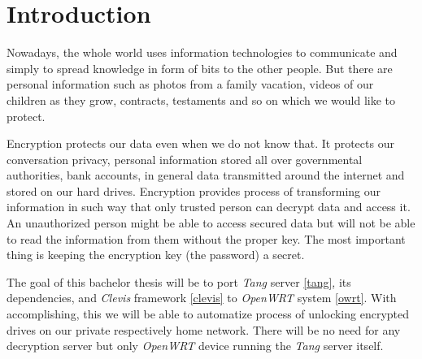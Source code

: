 \documentclass[../xdudla00-porting-Tang-to-Open-WRT.tex]{subfiles}
\begin{document}

\chapter{Introduction}\label{introduction}

Nowadays, the whole world uses information technologies to communicate and simply to spread knowledge in form of bits to the other people.  But there are personal information such as photos from a family vacation, videos of our children as they grow, contracts, testaments and so on which we would like to protect.

Encryption protects our data even when we do not know that. It protects our conversation privacy, personal information stored all over governmental authorities, bank accounts, in general data transmitted around the internet and stored on our hard drives. Encryption provides process of transforming our information in such way that only trusted person can decrypt data and access it. An unauthorized person might be able to access secured data but will not be able to read the information from them without the proper key. The most important thing is keeping the encryption key (the password) a secret.

The goal of this bachelor thesis will be to port %
{\it Tang} server \ref{tang}, its dependencies, and {\it Clevis} framework \ref{clevis} to {\it OpenWRT} system \ref{owrt}. With accomplishing, this we will be able to automatize process of unlocking encrypted drives on our private respectively home network. There will be no need for any decryption server but only {\it OpenWRT} device running the {\it Tang} server itself.


\end{document}
